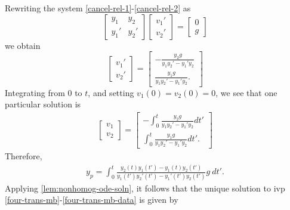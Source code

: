 \documentclass[12pt,reqno]{amsart}
\numberwithin{equation}{section}  %
\numberwithin{figure}{section}
\theoremstyle{plain}
\theoremstyle{definition}
\theoremstyle{remark}
\begin{document}
%
\\
\\
%
Rewriting the system \eqref{cancel-rel-1}-\eqref{cancel-rel-2}
as
  \begin{equation*}
  \begin{bmatrix}
    y_{1} & y_{2} \\
    y_{1}' & y_{2}'
  \end{bmatrix}
  \begin{bmatrix}
    v_{1}'
    \\
    v_{2}'
  \end{bmatrix}=
  \begin{bmatrix}
  0 \\
  g
  \end{bmatrix}
\end{equation*}
  we obtain 
  \begin{equation*}
\begin{bmatrix}
  v_{1}'
  \\
  v_{2}'
\end{bmatrix}=
\begin{bmatrix}
  -\frac{y_{2}g}{y_{1}y_{2}' - y_{1}' y_{2}} \\
  \frac{y_{1}g}{y_{1}y_{2}' - y_{1}' y_{2}}.
\end{bmatrix}
\end{equation*}
Integrating from $0$ to $t$, and setting $v_{1}(0) = v_{2}(0) = 0$, we see that
one particular solution is
%
%
\begin{equation*}
\begin{split}
\begin{bmatrix}
  v_{1}
  \\
  v_{2}
\end{bmatrix}=
\begin{bmatrix}
 -\int_{0}^{t} \frac{y_{2}g}{y_{1}y_{2}' - y_{1}' y_{2}} dt' \\
  \int_{0}^{t}\frac{y_{1}g}{y_{1}y_{2}' - y_{1}' y_{2}}dt'.
\end{bmatrix}
\end{split}
\end{equation*}
Therefore,
%
%
\begin{equation*}
\begin{split}
  y_{p} =  \int_{0}^{t}
  \frac{ y_{2}(t)y_{1}(t') - y_{1}(t)y_{2}(t')}{y_{1}(t')y_{2}'(t') -
  y_{1}'(t') y_{2}(t')}g \ dt'.
\end{split}
\end{equation*}
%
%
%
%
%
Applying \autoref{lem:nonhomog-ode-soln}, it follows that 
the unique solution to ivp
\eqref{four-trans-mb}-\eqref{four-trans-mb-data} is given by
\end{document}
